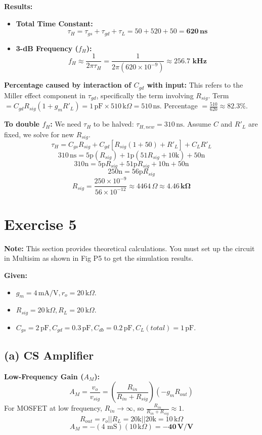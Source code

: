 \documentclass[11pt, a4paper]{article}
\newcommand{\mA}{\,\text{mA}}
\newcommand{\kohm}{\,\text{k}\Omega}
\newcommand{\pF}{\,\text{pF}}
\newcommand{\ns}{\,\text{ns}}
\begin{document}
\textbf{Results:}
\begin{itemize}
    \item \textbf{Total Time Constant:}
    \[ \tau_H = \tau_{gs} + \tau_{gd} + \tau_{L} = 50 + 520 + 50 = \mathbf{620 \ns} \]
    \item \textbf{3-dB Frequency ($f_H$):}
    \[ f_H \approx \frac{1}{2 \pi \tau_H} = \frac{1}{2 \pi (620 \times 10^{-9})} \approx \mathbf{256.7 \text{ kHz}} \]
\end{itemize}

\textbf{Percentage caused by interaction of $C_{gd}$ with input:}
This refers to the Miller effect component in $\tau_{gd}$, specifically the term involving $R_{sig}$.
Term $= C_{gd} R_{sig} (1 + g_m R'_L) = 1 \pF \times 510 \kohm = 510 \ns$.
Percentage $= \frac{510}{620} \approx \mathbf{82.3\%}$.

\textbf{To double $f_H$:}
We need $\tau_H$ to be halved: $\tau_{H,new} = 310 \ns$.
Assume $C$ and $R'_L$ are fixed, we solve for new $R_{sig}$.
\[ \tau_H = C_{gs} R_{sig} + C_{gd} [R_{sig}(1+50) + R'_L] + C_L R'_L \]
\[ 310 \ns = 5\text{p}(R_{sig}) + 1\text{p}(51 R_{sig} + 10\text{k}) + 50\text{n} \]
\[ 310\text{n} = 5\text{p} R_{sig} + 51\text{p} R_{sig} + 10\text{n} + 50\text{n} \]
\[ 250\text{n} = 56\text{p} R_{sig} \]
\[ R_{sig} = \frac{250 \times 10^{-9}}{56 \times 10^{-12}} \approx 4464\,\Omega \approx \mathbf{4.46 \kohm} \]

\section*{Exercise 5}

\textbf{Note:} This section provides theoretical calculations. You must set up the circuit in Multisim as shown in Fig P5 to get the simulation results.

\textbf{Given:}
\begin{itemize}
    \item $g_m = 4 \mA/\text{V}, r_o = 20 \kohm$.
    \item $R_{sig} = 20 \kohm, R_L = 20 \kohm$.
    \item $C_{gs} = 2 \pF, C_{gd} = 0.3 \pF, C_{db} = 0.2 \pF, C_L(total) = 1 \pF$.
\end{itemize}

\subsection*{(a) CS Amplifier}

\textbf{Low-Frequency Gain ($A_M$):}
\[ A_M = \frac{v_o}{v_{sig}} = \left(\frac{R_{in}}{R_{in} + R_{sig}}\right) (-g_m R_{out}) \]
For MOSFET at low frequency, $R_{in} \to \infty$, so $\frac{R_{in}}{R_{in} + R_{sig}} \approx 1$.
\[ R_{out} = r_o || R_L = 20\text{k} || 20\text{k} = 10 \kohm \]
\[ A_M = - (4 \text{ mS})(10 \kohm) = \mathbf{-40\,\text{V/V}} \]
\end{document}
